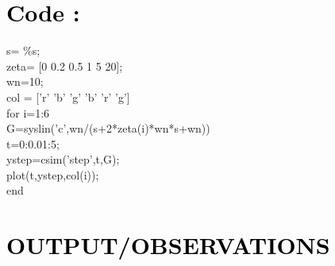 \documentclass[12pt]{article}
\begin{document}
\section*{\textcolor{black}{Code :}}
s= \%s;\\
zeta= [0 0.2 0.5 1 5 20];\\
wn=10;\\
col = ['r' 'b' 'g' 'b' 'r' 'g']\\
for i=1:6\\
     G=syslin('c',wn/(s+2*zeta(i)*wn*s+wn))\\
     t=0:0.01:5;\\
     ystep=csim('step',t,G);\\
     plot(t,ystep,col(i));\\
end\\
   \par 

\section*{\textcolor{black}{OUTPUT/OBSERVATIONS}}
\end{document}

